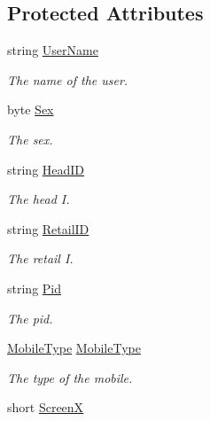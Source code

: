 \subsection*{Protected Attributes}
\begin{DoxyCompactItemize}
\item 
string \mbox{\hyperlink{class_t_net_1_1_contract_1_1_action_1_1_register_action_a2d3afc3ca14176558153ef7ba183a035}{User\+Name}}
\begin{DoxyCompactList}\small\item\em The name of the user. \end{DoxyCompactList}\item 
byte \mbox{\hyperlink{class_t_net_1_1_contract_1_1_action_1_1_register_action_a54b828f81b0bc155f9b6e7d4fe71cbc3}{Sex}}
\begin{DoxyCompactList}\small\item\em The sex. \end{DoxyCompactList}\item 
string \mbox{\hyperlink{class_t_net_1_1_contract_1_1_action_1_1_register_action_ae2b4498e6e558543a9798fc49f82f4d1}{Head\+ID}}
\begin{DoxyCompactList}\small\item\em The head I. \end{DoxyCompactList}\item 
string \mbox{\hyperlink{class_t_net_1_1_contract_1_1_action_1_1_register_action_a57b5d18f53094dac2cfccc74162286ff}{Retail\+ID}}
\begin{DoxyCompactList}\small\item\em The retail I. \end{DoxyCompactList}\item 
string \mbox{\hyperlink{class_t_net_1_1_contract_1_1_action_1_1_register_action_a967e7588185c4e966c8e2ee834d0dee0}{Pid}}
\begin{DoxyCompactList}\small\item\em The pid. \end{DoxyCompactList}\item 
\mbox{\hyperlink{namespace_t_net_1_1_service_a4153b2b37cffc4fde5d14a462ea83c7b}{Mobile\+Type}} \mbox{\hyperlink{class_t_net_1_1_contract_1_1_action_1_1_register_action_a9969b47e0db38208ced7f769c6d34afd}{Mobile\+Type}}
\begin{DoxyCompactList}\small\item\em The type of the mobile. \end{DoxyCompactList}\item 
short \mbox{\hyperlink{class_t_net_1_1_contract_1_1_action_1_1_register_action_a96bb5802e2dbbd4bba23e726ab8dc967}{ScreenX}}

\end{DoxyCompactItemize}
